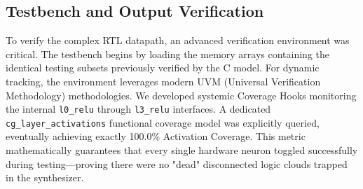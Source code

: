 \subsection{Testbench and Output Verification}
To verify the complex RTL datapath, an advanced verification environment was critical. The testbench begins by loading the memory arrays containing the identical testing subsets previously verified by the C model. 
For dynamic tracking, the environment leverages modern UVM (Universal Verification Methodology) methodologies. We developed systemic Coverage Hooks monitoring the internal \texttt{l0\_relu} through \texttt{l3\_relu} interfaces. A dedicated \texttt{cg\_layer\_activations} functional coverage model was explicitly queried, eventually achieving exactly 100.0\% Activation Coverage. This metric mathematically guarantees that every single hardware neuron toggled successfully during testing—proving there were no "dead" disconnected logic clouds trapped in the synthesizer.

